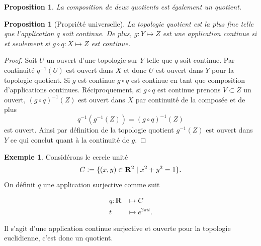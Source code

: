 \documentclass[12pt]{book}
\newcommand{\defeq}{\vcentcolon=}
\newtheorem{prop}[lemma]{Proposition}
\theoremstyle{definition}
\newtheorem{example}[lemma]{Exemple}
\theoremstyle{remark}
\begin{document}
	\begin{prop}
		La composition de deux quotients est également un quotient.
	\end{prop}
	\begin{prop}[Propriété universelle]
		La topologie quotient est la plus fine telle que l'application $q$ soit continue. De plus, $g : Y \longmapsto Z$ est une application continue si et seulement si $g \circ q : X \longmapsto Z$ est continue.
	\end{prop}
	\begin{proof}
		Soit $U$ un ouvert d'une topologie sur $Y$ telle que $q$ soit continue. Par continuité $q^{-1}(U)$ est ouvert dans $X$ et donc $U$ est ouvert dans $Y$ pour la topologie quotient. 
	Si $g$ est continue $g \circ q$ est continue en tant que composition d'applications continues. Réciproquement, si  $g \circ q$ est continue prenons $V \subset Z$ un ouvert, ${(g\circ q)}^{-1}(Z)$ est ouvert dans $X$ par continuité de la composée et de plus \[
			q^{-1}(g^{-1}(Z)) = (g \circ q)^{-1}(Z)
		\] est ouvert. Ainsi par définition de la topologie quotient $g^{-1}(Z)$ est ouvert dans $Y$ ce qui conclut quant à la continuité de $g$. 
	\end{proof}
	\begin{example}
		Considérons le cercle unité \[
			C \defeq \{(x,y) \in \mathbf{R}^2 \;|\; x^2 + y^2 = 1\} 
		.\] 
		On définit $q$ une application surjective comme suit \\ 
		\begin{minipage}{0.5\textwidth}
			\begin{align*}
				q : \mathbf{R} &\longmapsto C\\
				t&\longmapsto e^{2\pi it}
			.\end{align*}	
		\end{minipage}
		\hfill
		\begin{minipage}{0.5\textwidth}
			\centering
		\end{minipage}
		\bigskip

		Il s'agit d'une application continue surjective et ouverte pour la topologie euclidienne, c'est donc un quotient.
	\end{example}
	
\end{document}
